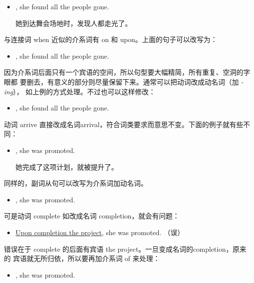 \begin{itemize}
\item {}, she found all the people gone.

  她到达舞会场地时，发现人都走光了。
\end{itemize}
与连接词 when 近似的介系词有 on 和 upon。上面的句子可以改写为：
\begin{itemize}
\item {}, she found all the people gone.
\end{itemize}

因为介系词后面只有一个宾语的空间，所以句型要大幅精简，所有重复、空洞的字眼都
要删去，有意义的部分则尽量保留下来。通常可以把动词改成动名词（加 \emph{-ing}），
如上例的方式处理。不过也可以这样修改：
\begin{itemize}
\item {}, she found all the people gone.
\end{itemize}
动词 arrive 直接改成名词arrival，符合词类要求而意思不变。下面的例子就有些不
同：
\begin{itemize}
\item {}, she was promoted.

  她完成了这项计划，就被提升了。
\end{itemize}
同样的，副词从句可以改写为介系词加动名词。
\begin{itemize}
\item {}, she was promoted.
\end{itemize}

可是动词 complete 如改成名词 completion，就会有问题：
\begin{itemize}
\item \ul{Upon completion the project}, she was promoted. （误）
\end{itemize}
错误在于 complete 的后面有宾语 the project。一旦变成名词的completion，原来的
宾语就无所归依，所以要再加介系词 of 来处理：

\begin{itemize}
\item {}, she was promoted.
\end{itemize}

